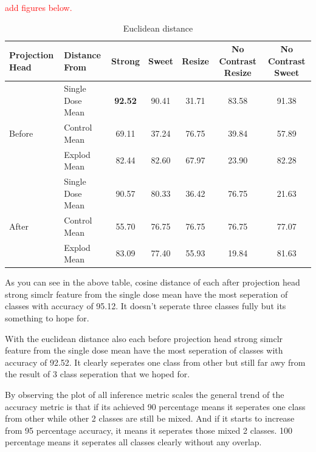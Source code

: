 \textcolor{red}{ add figures below. }

\begin{table}[H]
  \centering
  \begin{tabular}{@{}llccccc@{}}
  \toprule
  Projection Head & Distance From      & Strong & Sweet & Resize & No Contrast Resize & No Contrast Sweet \\ \midrule
                  & Single Dose Mean   & \textbf{92.52}      & 90.41     & 31.71      & 83.58                  &  91.38                \\
  Before          & Control Mean       & 69.11      & 37.24     & 76.75      & 39.84                  & 57.89                 \\
                  & Explod Mean        & 82.44      & 82.60    & 67.97      & 23.90                  & 82.28                 \\ \midrule
                  & Single Dose Mean   & 90.57     & 80.33     & 36.42      & 76.75                  & 21.63                 \\
  After           & Control Mean       & 55.70      & 76.75     & 76.75      & 76.75                  & 77.07                 \\
                  & Explod Mean        & 83.09      & 77.40     & 55.93      & 19.84                  &  81.63                \\ \bottomrule
  \end{tabular}
  \caption{Euclidean distance}
  \label{tab:table_label}
\end{table}

As you can see in the above table, cosine distance of each after projection head strong simclr feature from the single dose mean have the most seperation of classes with accuracy of 95.12. It doesn't seperate three classes fully but its something to hope for. 

With the euclidean distance also  each before projection head strong simclr feature from the single dose mean have the most seperation of classes with accuracy of 92.52. It clearly  seperates one class from other but still far awy from the result of 3 class seperation that we hoped for.

By observing the plot of all inference metric scales the general trend of the accuracy metric is that if its achieved 90 percentage means it seperates one class from other while other 2 classes are still be mixed. And if it starts to increase  from   95 percentage accuracy, it means it seperates those mixed  2 classes. 100 percentage means it seperates all classes clearly without any overlap.

